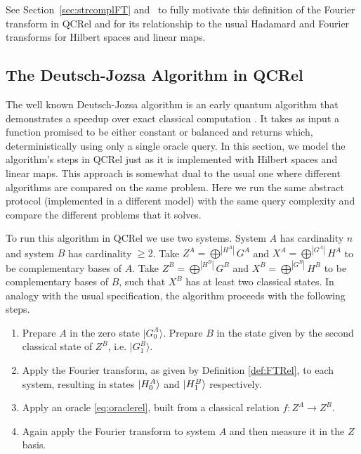 See Section~\ref{sec:strcomplFT} and~\cite{gogioso2015fourier} to fully motivate this definition of the Fourier transform in QCRel and for its relationship to the usual Hadamard and Fourier transforms for Hilbert spaces and linear maps.

\subsection{The Deutsch-Jozsa Algorithm in QCRel}
\label{sec:qcreldj}
The well known Deutsch-Jozsa algorithm is an early quantum algorithm that demonstrates a speedup over exact classical computation \cite{DJAlg1992}. It takes as input a function promised to be either constant or balanced and returns which, deterministically using only a single oracle query. In this section, we model the algorithm's steps in QCRel just as it is implemented with Hilbert spaces and linear maps. This approach is somewhat dual to the usual one where different algorithms are compared on the same problem. Here we run the same abstract protocol (implemented in a different model) with the same query complexity and compare the different problems that it solves.

To run this algorithm in QCRel we use two systems.  System $A$ has cardinality $n$ and system $B$ has cardinality $\ge 2$. Take $Z^A=\bigoplus^{|H^{A}|}G^A$ and $X^A=\bigoplus^{|G^{A}|}H^A$ to be complementary bases of $A$. Take $Z^B=\bigoplus^{|H^{B}|}G^B$ and $X^B=\bigoplus^{|G^{B}|}H^B$ to be complementary bases of $B$, such that $X^B$ has at least two classical states. In analogy with the usual specification, the algorithm proceeds with the following steps.
\begin{enumerate}
\item Prepare $A$ in the zero state $|G^{A}_0\rangle$. Prepare $B$ in the state given by the second classical state of $Z^B$, i.e. $|G^B_1\rangle$.

\item Apply the Fourier transform, as given by Definition \ref{def:FTRel}, to each system, resulting in states $| H_0^A \rangle$ and $| H_1^B \rangle$ respectively.

\item Apply an oracle \eqref{eq:oraclerel}, built from a classical relation $f:Z^A\to Z^B$.

\item Again apply the Fourier transform to system $A$ and then measure it in the $Z$ basis.
\end{enumerate}

